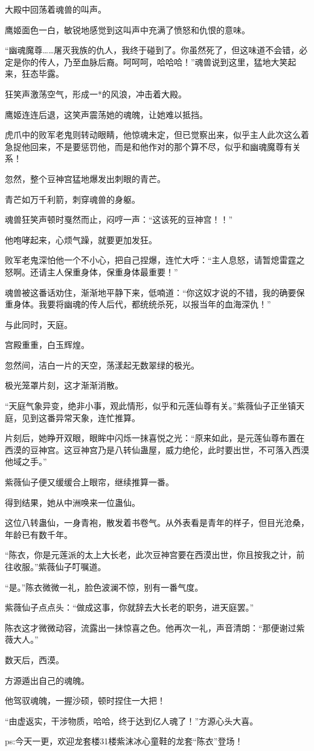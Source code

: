 \begin{this_body}
大殿中回荡着魂兽的叫声。

鹰姬面色一白，敏锐地感觉到这叫声中充满了愤怒和仇恨的意味。

“幽魂魔尊……屠灭我族的仇人，我终于碰到了。你虽然死了，但这味道不会错，必定是你的传人，乃至血脉后裔。呵呵呵，哈哈哈！”魂兽说到这里，猛地大笑起来，狂态毕露。

狂笑声激荡空气，形成一*的风浪，冲击着大殿。

鹰姬连连后退，这笑声震荡她的魂魄，让她难以抵挡。

虎爪中的败军老鬼则转动眼睛，他惊魂未定，但已觉察出来，似乎主人此次这么着急捉他回来，不是要惩罚他，而是和他作对的那个算不尽，似乎和幽魂魔尊有关系！

忽然，整个豆神宫猛地爆发出刺眼的青芒。

青芒如万千利箭，刺穿魂兽的身躯。

魂兽狂笑声顿时戛然而止，闷哼一声：“这该死的豆神宫！！”

他咆哮起来，心烦气躁，就要更加发狂。

败军老鬼深怕他一个不小心，把自己捏爆，连忙大呼：“主人息怒，请暂熄雷霆之怒啊。还请主人保重身体，保重身体最重要！”

魂兽被这番话劝住，渐渐地平静下来，低喃道：“你这奴才说的不错，我的确要保重身体。我要将幽魂的传人后代，都统统杀死，以报当年的血海深仇！”

与此同时，天庭。

宫殿重重，白玉辉煌。

忽然间，洁白一片的天空，荡漾起无数翠绿的极光。

极光笼罩片刻，这才渐渐消散。

“天庭气象异变，绝非小事，观此情形，似乎和元莲仙尊有关。”紫薇仙子正坐镇天庭，见到这番异常天象，连忙推算。

片刻后，她睁开双眼，眼眸中闪烁一抹喜悦之光：“原来如此，是元莲仙尊布置在西漠的豆神宫。这豆神宫乃是八转仙蛊屋，威力绝伦，此时要出世，不可落入西漠他域之手。”

紫薇仙子便又缓缓合上眼帘，继续推算一番。

得到结果，她从中洲唤来一位蛊仙。

这位八转蛊仙，一身青袍，散发着书卷气。从外表看是青年的样子，但目光沧桑，年龄已有数千年。

“陈衣，你是元莲派的太上大长老，此次豆神宫要在西漠出世，你且按我之计，前往收服。”紫薇仙子叮嘱道。

“是。”陈衣微微一礼，脸色波澜不惊，别有一番气度。

紫薇仙子点点头：“做成这事，你就辞去大长老的职务，进天庭罢。”

陈衣这才微微动容，流露出一抹惊喜之色。他再次一礼，声音清朗：“那便谢过紫薇大人。”

数天后，西漠。

方源遁出自己的魂魄。

他驾驭魂魄，一握沙硕，顿时捏住一大把！

“由虚返实，干涉物质，哈哈，终于达到亿人魂了！”方源心头大喜。

ps:今天一更，欢迎龙套楼31楼紫沫冰心童鞋的龙套“陈衣”登场！

\end{this_body}

